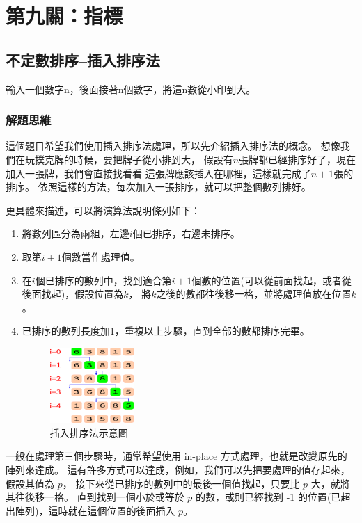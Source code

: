 \chapter{第九關：指標}

\section{不定數排序--插入排序法}
\label{L9_01}
輸入一個數字n，後面接著n個數字，將這n數從小印到大。

\subsection{解題思維}

這個題目希望我們使用插入排序法處理，所以先介紹插入排序法的概念。
想像我們在玩撲克牌的時候，要把牌子從小排到大，
假設有$n$張牌都已經排序好了，現在加入一張牌，我們會直接找看看
這張牌應該插入在哪裡，這樣就完成了$n+1$張的排序。
依照這樣的方法，每次加入一張排序，就可以把整個數列排好。

更具體來描述，可以將演算法說明條列如下：
\begin{enumerate}
	\item 將數列區分為兩組，左邊$i$個已排序，右邊未排序。
	\item 取第$i+1$個數當作處理值。
	\item 在$i$個已排序的數列中，找到適合第$i+1$個數的位置(可以從前面找起，或者從後面找起)，假設位置為$k$，
	將$k$之後的數都往後移一格，並將處理值放在位置$k$。
	\item 已排序的數列長度加1，重複以上步驟，直到全部的數都排序完畢。
	\begin{figure}[H]
		\centering
		\includegraphics[width=0.3\textwidth]{fig/L9/L9_01}
		\caption{插入排序法示意圖}
	\end{figure}
\end{enumerate}

一般在處理第三個步驟時，通常希望使用 in-place 方式處理，也就是改變原先的陣列來達成。
這有許多方式可以達成，例如，我們可以先把要處理的值存起來，假設其值為 $p$，
接下來從已排序的數列中的最後一個值找起，只要比 $p$ 大，就將其往後移一格。
直到找到一個小於或等於 $p$ 的數，或則已經找到 -1 的位置(已超出陣列)，這時就在這個位置的後面插入 $p$。

